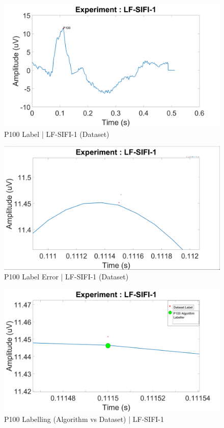 \documentclass{article}
\begin{document}
	
	\begin{figure}[tbh!]\label{LF-SIFI-1}
		\centering
		\includegraphics[scale=0.2]{"Images/LF-SIFI-1_Plot.png"}
		\caption{P100 Label | LF-SIFI-1 (Dataset)}
	\end{figure}
	
	\begin{figure}[tbh!]\label{LF-SIFI-1-Error}
		\centering
		\includegraphics[scale=0.2]{"Images/LF-SIFI-1_Plot_Error.png"}
		\caption{P100 Label Error | LF-SIFI-1 (Dataset)}
	\end{figure}
	
	\begin{figure}[tbh!]\label{LF-SIFI-1-ErrorFix}
		\centering
		\includegraphics[scale=0.2]{"Images/LF-SIFI-1_Plot_ErrorFix.png"}
		\caption{P100 Labelling (Algorithm vs Dataset) | LF-SIFI-1}
	\end{figure}
	
\end{document}
